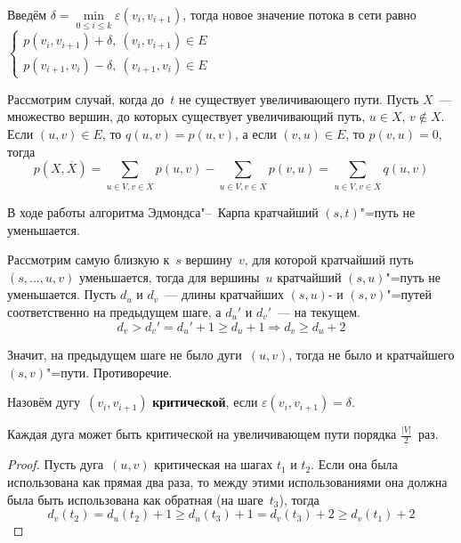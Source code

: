 Введём $\delta = \min\limits_{0 \leqslant i \leqslant k} \varepsilon(v_i, v_{i+1})$, тогда новое значение потока в сети равно
$\begin{cases}
p(v_i, v_{i+1}) + \delta, \ (v_i, v_{i+1}) \in E \\
p(v_{i+1}, v_i) - \delta, \ (v_{i+1}, v_i) \in E
\end{cases}$

Рассмотрим случай, когда до~$t$ не существует увеличивающего пути.
Пусть $X$~--- множество вершин, до которых существует увеличивающий путь, $u \in X$, $v \notin X$.
Если $(u, v) \in E$, то $q(u, v) = p(u, v)$, а если $(v, u) \in E$, то $p(v, u) = 0$, тогда
\begin{equation*}
p(X, \overline X) =
\sum_{u \in V, v \in \overline X} p(u, v) - \sum_{u \in V, v \in \overline X} p(v, u) =
\sum_{u \in V, v \in \overline X} q(u, v)
\end{equation*}

\begin{lemma}
В ходе работы алгоритма Эдмондса"--~Карпа кратчайший $(s, t)$"=путь не уменьшается.
\end{lemma}
\begin{proofcontra}
Рассмотрим самую близкую к~$s$ вершину~$v$, для которой кратчайший путь~$(s, \ldots, u, v)$ уменьшается, тогда для вершины~$u$ кратчайший $(s, u)$"=путь не уменьшается.
Пусть $d_u$ и $d_v$~--- длины кратчайших $(s, u)$- и $(s, v)$"=путей соответственно на предыдущем шаге, а $d_u'$ и $d_v'$~--- на текущем.
\begin{equation*}
d_v > d_v' = d_u' + 1 \geqslant d_u + 1 \Rightarrow d_v \geqslant d_u + 2
\end{equation*}

Значит, на предыдущем шаге не было дуги~$(u, v)$, тогда не было и кратчайшего $(s, v)$"=пути.
Противоречие.
\end{proofcontra}

Назовём дугу~$(v_i, v_{i+1})$ \textbf{критической}, если $\varepsilon(v_i, v_{i+1}) = \delta$.

\begin{lemma}
Каждая дуга может быть критической на увеличивающем пути порядка $\frac{|V|}2$~раз.
\end{lemma}
\begin{proof}
Пусть дуга~$(u, v)$ критическая на шагах $t_1$ и $t_2$.
Если она была использована как прямая два раза, то между этими использованиями она должна была быть использована как обратная (на шаге~$t_3$), тогда
\begin{equation*}
d_v(t_2) = d_u(t_2) + 1 \geqslant
d_u(t_3) + 1 = d_v(t_3) + 2 \geqslant
d_v(t_1) + 2
\end{equation*}
\end{proof}